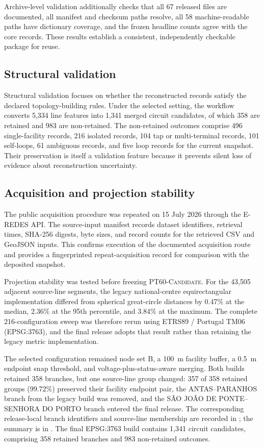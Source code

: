 \documentclass[10pt]{article}
\newcommand{\dataset}{\textsc{PT60-Candidate}\xspace}
\begin{document}
Archive-level validation additionally checks that all 67 released files are documented, all manifest and checksum paths resolve, all 58 machine-readable paths have dictionary coverage, and the frozen headline counts agree with the core records. These results establish a consistent, independently checkable package for reuse.

\subsection{Structural validation}

Structural validation focuses on whether the reconstructed records satisfy the declared topology-building rules. Under the selected setting, the workflow converts 5,334 line features into 1,341 merged circuit candidates, of which 358 are retained and 983 are non-retained. The non-retained outcomes comprise 496 single-facility records, 216 isolated records, 104 tap or multi-terminal records, 101 self-loops, 61 ambiguous records, and five loop records for the current snapshot. Their preservation is itself a validation feature because it prevents silent loss of evidence about reconstruction uncertainty.

\subsection{Acquisition and projection stability}
\label{sec:projection-transition-audit}

The public acquisition procedure was repeated on 15 July 2026 through the E-REDES API. The source-input manifest records dataset identifiers, retrieval times, SHA-256 digests, byte sizes, and record counts for the retrieved CSV and GeoJSON inputs. This confirms execution of the documented acquisition route and provides a fingerprinted repeat-acquisition record for comparison with the deposited snapshot.

Projection stability was tested before freezing \dataset. For the 43,505 adjacent source-line segments, the legacy national-centre equirectangular implementation differed from spherical great-circle distances by 0.47\% at the median, 2.36\% at the 95th percentile, and 3.84\% at the maximum. The complete 216-configuration sweep was therefore rerun using ETRS89 / Portugal TM06 (EPSG:3763), and the final release adopts that result rather than retaining the legacy metric implementation.

The selected configuration remained node set B, a 100~m facility buffer, a 0.5~m endpoint snap threshold, and voltage-plus-status-aware merging. Both builds retained 358 branches, but one source-line group changed: 357 of 358 retained groups (99.72\%) preserved their facility endpoint pair, the ANTAS--PARANHOS branch from the legacy build was removed, and the SÃO JOÃO DE PONTE--SENHORA DO PORTO branch entered the final release. The corresponding release-local branch identifiers and source-line membership are recorded in ; the summary is in . The final EPSG:3763 build contains 1,341 circuit candidates, comprising 358 retained branches and 983 non-retained outcomes.
\end{document}

